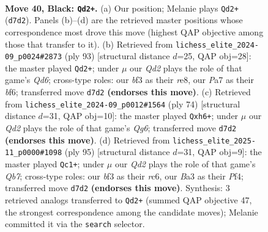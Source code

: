 \documentclass[11pt]{article}
\begin{document}
\clearpage

\begin{figure}[p]\centering
\begin{subfigure}{0.46\textwidth}\centering
\resizebox{\linewidth}{!}{%
\newchessgame
\chessboard[
  setfen={8/pp1q2kp/6p1/4R3/5PPP/b4B2/5K2/8 b - - 4 40},
  showmover=false,
  pgfstyle=straightmove, color=movearrow, markmove={d7-d2}
]}
\caption{}
\end{subfigure}\hfill
\begin{subfigure}{0.46\textwidth}\centering
\resizebox{\linewidth}{!}{%
\newchessgame
\chessboard[
  setfen={4R3/8/kp3Bp1/6P1/1K5p/3q3P/P3p3/8 b - - 3 47},
  showmover=false,
  pgfstyle=straightmove, color=movearrow, markmove={d3-d2}
]}
\caption{}
\end{subfigure}
\\[4pt]
\begin{subfigure}{0.46\textwidth}\centering
\resizebox{\linewidth}{!}{%
\newchessgame
\chessboard[
  setfen={7k/8/4p1Qp/4P2P/r7/pb4P1/5P2/6K1 w - - 0 38},
  showmover=false,
  pgfstyle=straightmove, color=movearrow, markmove={g6-h6}
]}
\caption{}
\end{subfigure}\hfill
\begin{subfigure}{0.46\textwidth}\centering
\resizebox{\linewidth}{!}{%
\newchessgame
\chessboard[
  setfen={8/8/2R4p/kp4p1/5pP1/2P2B2/1q6/6K1 b - - 2 48},
  showmover=false,
  pgfstyle=straightmove, color=movearrow, markmove={b2-c1}
]}
\caption{}
\end{subfigure}
\caption{\textbf{Move 40, Black: \texttt{Qd2+}.} (a) Our position; Melanie plays \texttt{Qd2+} (\texttt{d7d2}). Panels (b)--(d) are the retrieved master positions whose correspondence most drove this move (highest QAP objective among those that transfer to it). (b) Retrieved from \texttt{lichess\_elite\_2024-09\_p0024\#2873} (ply 93) [structural distance $d$=25, QAP obj=28]: the master played \texttt{Qd2+}; under $\mu$ our \emph{Qd2} plays the role of that game's \emph{Qd6}; cross-type roles: our \emph{b}f3 as their \emph{r}e8, our \emph{P}a7 as their \emph{b}f6; transferred move \texttt{d7d2} \textbf{(endorses this move)}. (c) Retrieved from \texttt{lichess\_elite\_2024-09\_p0012\#1564} (ply 74) [structural distance $d$=31, QAP obj=10]: the master played \texttt{Qxh6+}; under $\mu$ our \emph{Qd2} plays the role of that game's \emph{Qg6}; transferred move \texttt{d7d2} \textbf{(endorses this move)}. (d) Retrieved from \texttt{lichess\_elite\_2025-11\_p0000\#1098} (ply 95) [structural distance $d$=31, QAP obj=9]: the master played \texttt{Qc1+}; under $\mu$ our \emph{Qd2} plays the role of that game's \emph{Qb7}; cross-type roles: our \emph{b}f3 as their \emph{r}c6, our \emph{B}a3 as their \emph{P}f4; transferred move \texttt{d7d2} \textbf{(endorses this move)}. Synthesis: 3 retrieved analogs transferred to \texttt{Qd2+} (summed QAP objective 47, the strongest correspondence among the candidate moves); Melanie committed it via the \texttt{search} selector.}
\label{fig:thought-m79}
\end{figure}
\end{document}
